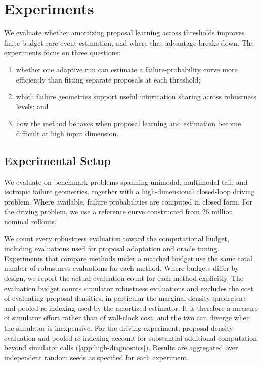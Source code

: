 \documentclass[twoside,11pt]{article}
\begin{document}
\section{Experiments}
\label{sec:experiments}

We evaluate whether amortizing proposal learning across thresholds improves finite-budget rare-event estimation, and where that advantage breaks down. The experiments focus on three questions:
\begin{enumerate}[label=(\roman*)]
    \item whether one adaptive run can estimate a failure-probability curve more efficiently than fitting separate proposals at each threshold;
    \item which failure geometries support useful information sharing across robustness levels; and
    \item how the method behaves when proposal learning and estimation become difficult at high input dimension.
\end{enumerate}

\subsection{Experimental Setup}
\label{sec:experimental-setup}

We evaluate on benchmark problems spanning unimodal, multimodal-tail, and isotropic failure geometries, together with a high-dimensional closed-loop driving problem. Where available, failure probabilities are computed in closed form. For the driving problem, we use a reference curve constructed from $26$ million nominal rollouts.

We count every robustness evaluation toward the computational budget, including evaluations used for proposal adaptation and oracle tuning. Experiments that compare methods under a matched budget use the same total number of robustness evaluations for each method. Where budgets differ by design, we report the actual evaluation count for each method explicitly. The evaluation budget counts simulator robustness evaluations and excludes the cost of evaluating proposal densities, in particular the marginal-density quadrature and pooled re-indexing used by the amortized estimator. It is therefore a measure of simulator effort rather than of wall-clock cost, and the two can diverge when the simulator is inexpensive. For the driving experiment, proposal-density evaluation and pooled re-indexing account for substantial additional computation beyond simulator calls (\cref{app:high-diagnostics}). Results are aggregated over independent random seeds as specified for each experiment.
\end{document}
